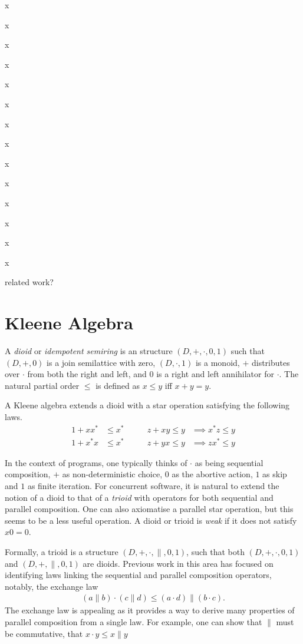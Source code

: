 \documentclass{llncs}
\begin{document}
x

x

x

x

x

x

x

x

x

x

x

x

x

x

related work?

\newpage
\section{Kleene Algebra}
\label{sec:KA}

A \emph{dioid} or \emph{idempotent semiring} is an structure
$(D,+,\cdot,0,1)$ such that $(D,+,0)$ is a join semilattice with zero,
$(D,\cdot,1)$ is a monoid, $+$ distributes over $\cdot$ from both the
right and left, and $0$ is a right and left annihilator for
$\cdot$. The natural partial order $\le$ is defined as $x \le y $ iff
$x + y = y$.

A Kleene algebra extends a dioid with a star operation satisfying the
following laws.
\begin{align*}
  1 + xx^* &\le x^* &\qquad z + xy \le y &\implies x^*z \le y\\
  1 + x^*x &\le x^* &\qquad z + yx \le y &\implies zx^* \le y
\end{align*}

In the context of programs, one typically thinks of $\cdot$ as being
sequential composition, $+$ as non-deterministic choice, $0$ as the
abortive action, $1$ as skip and $1$ as finite iteration. For
concurrent software, it is natural to extend the notion of a dioid to
that of a \emph{trioid} with operators for both sequential and
parallel composition. One can also axiomatise a parallel star
operation, but this seems to be a less useful operation. A
dioid or trioid is \emph{weak} if it does not satisfy $x0 = 0$.

Formally, a trioid is a structure $(D,+,\cdot,\|,0,1)$, such that
both $(D,+,\cdot,0,1)$ and $(D,+,\|,0,1)$ are dioids. Previous work in
this area has focused on identifying laws linking the sequential and
parallel composition operators, notably, the exchange law
\begin{align*}
  (a \| b) \cdot (c \| d) \le (a \cdot d) \| (b \cdot c).
\end{align*}
The exchange law is appealing as it provides a way to derive many
properties of parallel composition from a single law. For example, one
can show that $\|$ must be commutative, that $x \cdot y \le x \| y$
\end{document}
